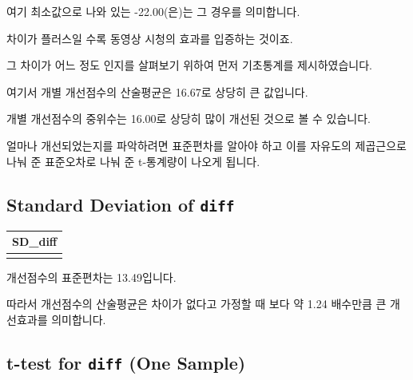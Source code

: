 \documentclass[
]{book}
\begin{document}
여기 최소값으로 나와 있는 -22.00(은)는 그 경우를 의미합니다.

차이가 플러스일 수록 동영상 시청의 효과를 입증하는 것이죠.

그 차이가 어느 정도 인지를 살펴보기 위하여 먼저 기초통계를 제시하였습니다.

여기서 개별 개선점수의 산술평균은 16.67로 상당히 큰 값입니다.

개별 개선점수의 중위수는 16.00로 상당히 많이 개선된 것으로 볼 수 있습니다.

얼마나 개선되었는지를 파악하려면 표준편차를 알아야 하고 이를 자유도의 제곱근으로 나눠 준 표준오차로 나눠 준 t-통계량이 나오게 됩니다.

\subsection{\texorpdfstring{Standard Deviation of \texttt{diff}}{Standard Deviation of diff}}\label{standard-deviation-of-diff}

\begin{longtable}[]{@{}
  >{\raggedright\arraybackslash}p{}@{}}
\toprule\noalign{}
\begin{minipage}[b]{\linewidth}\raggedright
SD\_diff
\end{minipage} \\
\midrule\noalign{}
\endhead
\bottomrule\noalign{}
\endlastfoot
13.49 \\
\end{longtable}

개선점수의 표준편차는 13.49입니다.

따라서 개선점수의 산술평균은 차이가 없다고 가정할 때 보다 약 1.24 배수만큼 큰 개선효과를 의미합니다.

\subsection{\texorpdfstring{t-test for \texttt{diff} (One Sample)}{t-test for diff (One Sample)}}\label{t-test-for-diff-one-sample}
\end{document}

